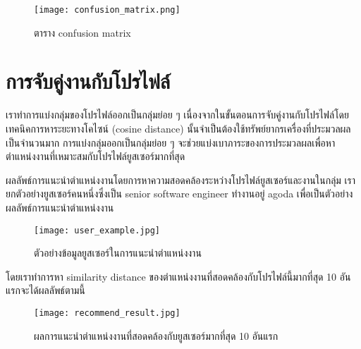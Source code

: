 \begin{figure}[!h]
  \centering
  \texttt{[image: confusion\_matrix.png]}  
  \caption{ตาราง confusion matrix}
  \label{Fig:result-classify-report}
\end{figure}

\newpage
\section{การจับคู่งานกับโปรไฟล์}
เราทำการแบ่งกลุ่มของโปรไฟล์ออกเป็นกลุ่มย่อย ๆ เนื่องจากในขั้นตอนการจับคู่งานกับโปรไฟล์โดยเทคนิคการหาระยะทางโคไซน์ (cosine distance) นั้นจำเป็นต้องใช้ทรัพย์ยากรเครื่องที่ประมวลผลเป็นจำนวนมาก การแบ่งกลุ่มออกเป็นกลุ่มย่อย ๆ จะช่วยแบ่งเบาภาระของการประมวลผลเพื่อหาตำแหน่งงานที่เหมาะสมกับโปรไฟล์ยูสเซอร์มากที่สุด

ผลลัพธ์การแนะนำตำแหน่งงานโดยการหาความสอดคล้องระหว่างโปรไฟล์ยูสเซอร์และงานในกลุ่ม เรายกตัวอย่างยูสเซอร์คนหนึ่งซึ่งเป็น senior software engineer ทำงานอยู่ agoda เพื่อเป็นตัวอย่างผลลัพธ์การแนะนำตำแหน่งงาน


\begin{figure}[!h]
  \centering
  \texttt{[image: user\_example.jpg]}  
  \caption{ตัวอย่างข้อมูลยูสเซอร์ในการแนะนำตำแหน่งงาน}
  \label{Fig:result-classify-report}
\end{figure}

\newpage

โดยเราทำการหา similarity distance ของตำแหน่งงานที่สอดคล้องกับโปรไฟล์นี้มากที่สุด 10 อันแรกจะได้ผลลัพธ์ตามนี้


\begin{figure}[!h]
  \centering
  \texttt{[image: recommend\_result.jpg]}  
  \caption{ผลการแนะนำตำแหน่งงานที่สอดคล้องกับยูสเซอร์มากที่สุด 10 อันแรก}
  \label{Fig:result-classify-report}
\end{figure}